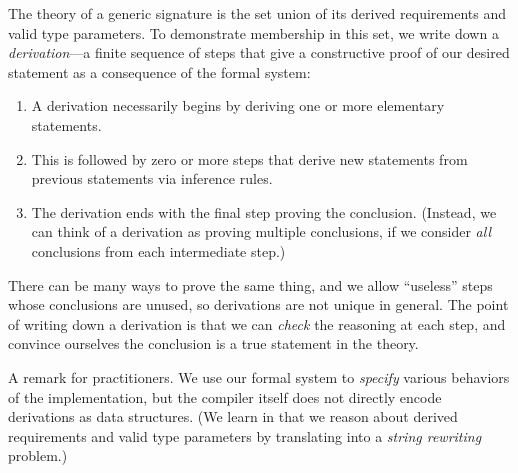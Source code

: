 \documentclass[../generics]{subfiles}
\begin{document}
The theory of a generic signature is the set union of its derived requirements and valid type parameters. To demonstrate membership in this set, we write down a \emph{derivation}---a finite sequence of steps that give a constructive proof of our desired statement as a consequence of the formal system:
\begin{enumerate}
\item A derivation necessarily begins by deriving one or more elementary statements.
\item This is followed by zero or more steps that derive new statements from previous statements via inference rules.
\item The derivation ends with the final step proving the conclusion. (Instead, we can think of a derivation as proving multiple conclusions, if we consider \emph{all} conclusions from each intermediate step.)
\end{enumerate}
There can be many ways to prove the same thing, and we allow ``useless'' steps whose conclusions are unused, so derivations are not unique in general. The point of writing down a derivation is that we can \emph{check} the reasoning at each step, and convince ourselves the conclusion is a true statement in the theory.

A remark for practitioners. We use our formal system to \emph{specify} various behaviors of the implementation, but the compiler itself does not directly encode derivations as data structures. (We learn in  that we reason about derived requirements and valid type parameters by translating into a \emph{string rewriting} problem.)
\end{document}
